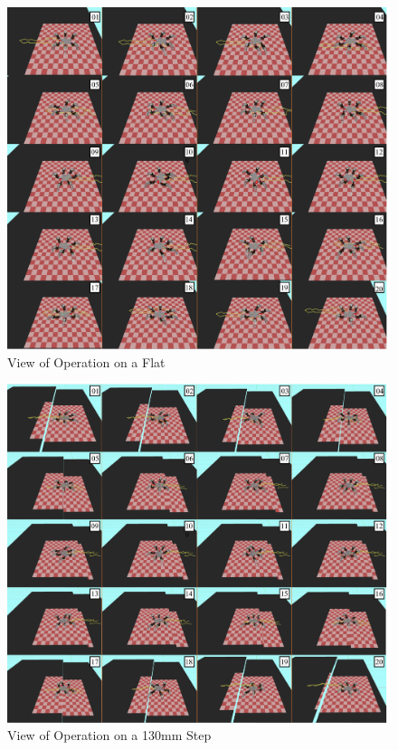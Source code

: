 \begin{figure}[htbp]
  \begin{center}
    \includegraphics[width=1.0\linewidth]{figure/chapter4/integration/flat_view.png}
    \caption{View of Operation on a Flat}
    \label{fig:ch4_result_integration_view_flat}  %
  \end{center}
\end{figure}

\begin{figure}[htbp]
  \begin{center}
    \includegraphics[width=1.0\linewidth]{figure/chapter4/integration/130mm_view.png}
    \caption{View of Operation on a 130mm Step}
    \label{fig:ch4_result_integration_view_130mm}  %
  \end{center}
\end{figure}

